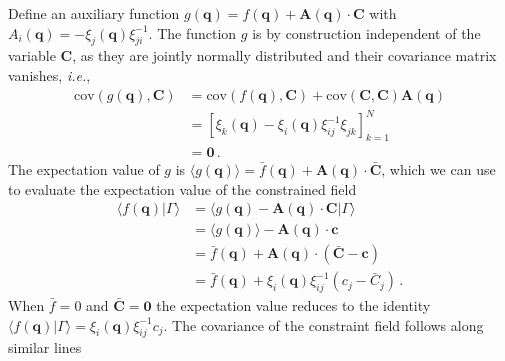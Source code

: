 \documentclass[a4paper, 11pt]{article}
\begin{document}
Define an auxiliary function $g(\bm{q}) = f(\bm{q}) + \bm{A}(\bm{q}) \cdot \bm{C}$ with $A_i(\bm{q}) = -\xi_j(\bm{q}) \xi_{ji}^{-1}$. The function $g$ is by construction independent of the variable $\bm{C}$, as they are jointly normally distributed and their covariance matrix vanishes, \textit{i.e.}, 
\begin{align}
\text{cov}(g(\bm{q}),\bm{C})
&=\text{cov}(f(\bm{q}),\bm{C}) +  \text{cov}(\bm{C},\bm{C}) \bm{A}(\bm{q}) \\
&=[\xi_k(\bm{q}) - \xi_i(\bm{q}) \xi_{ij}^{-1}\xi_{jk}]_{k=1}^N\\
&=\bm{0}\,.
\end{align}
The expectation value of $g$ is $\langle g(\bm{q})\rangle = \bar{f}(\bm{q}) + \bm{A}(\bm{q}) \cdot \bar{\bm{C}}$, which we can use to evaluate the expectation value of the constrained field
\begin{align}
\langle f(\bm{q}) | \Gamma \rangle 
&=\langle g(\bm{q}) - \bm{A}(\bm{q})\cdot \bm{C}|\Gamma\rangle\\
&=\langle g(\bm{q})\rangle - \bm{A}(\bm{q}) \cdot \bm{c}\\
&=\bar{f}(\bm{q}) + \bm{A}(\bm{q})\cdot (\bar{\bm{C}}-\bm{c})\\
&= \bar{f}(\bm{q}) + \xi_i(\bm{q})\xi_{ij}^{-1}(c_j -\bar{C}_j)\,.
\end{align}
When $\bar{f} = 0$ and $\bar{\bm{C}}=\bm{0}$ the expectation value reduces to the identity $\langle f(\bm{q}) | \Gamma \rangle =\xi_i(\bm{q})\xi_{ij}^{-1}c_j$. The covariance of the constraint field follows along similar lines
\end{document}
